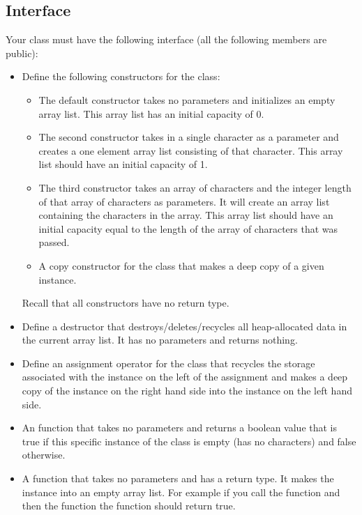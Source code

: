 \documentclass[11pt]{report}
\begin{document}
\subsection*{Interface}
Your class must have the following interface (all the following members are public):
\begin{itemize}
    \item Define the following constructors for the  class: 
    \begin{itemize}
        \item The default constructor takes no parameters and initializes an
        empty array list.  This array list has an initial capacity of 0.
        \item The second constructor takes in a single character as a parameter
        and creates a one element array list consisting of that character.
        This array list should have an initial capacity of 1.
        \item The third constructor takes an array of characters and the integer
        length of that array of characters as parameters.  It will create
        an array list containing the characters in the array.  This array
        list should have an initial capacity equal to the length of the
        array of characters that was passed.
        \item A copy constructor for the class that makes a deep copy of a given
        instance.
    \end{itemize}
     Recall that all constructors have no return type.
     \item  Define a destructor that destroys/deletes/recycles all
      heap-allocated data in the current array list.  It has no
      parameters and returns nothing.

    \item Define an assignment operator for the class that recycles the
      storage associated with the instance on the left of the assignment
      and makes a deep copy of the instance on the right hand side into
      the instance on the left hand side.

    \item An  function that takes no parameters and returns a
      boolean value that is true if this specific instance of the class
      is empty (has no characters) and false otherwise.

    \item A  function that takes no parameters and has a  return
      type.  It makes the instance into an empty array list.  For
      example if you call the  function and then the 
      function the  function should return true.


\end{itemize}
\end{document}
